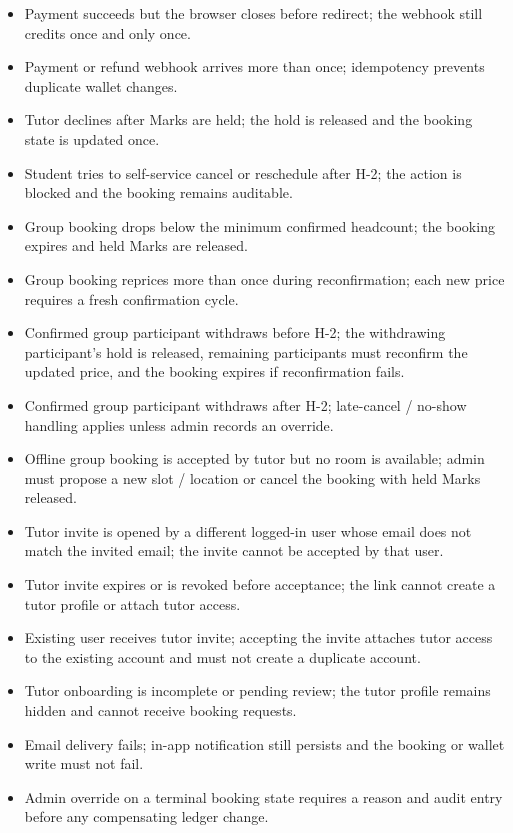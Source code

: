 \documentclass[11pt,a4paper]{article}
\begin{document}
\begin{itemize}
    \item Payment succeeds but the browser closes before redirect; the webhook still credits once and only once.
    \item Payment or refund webhook arrives more than once; idempotency prevents duplicate wallet changes.
    \item Tutor declines after Marks are held; the hold is released and the booking state is updated once.
    \item Student tries to self-service cancel or reschedule after H-2; the action is blocked and the booking remains auditable.
    \item Group booking drops below the minimum confirmed headcount; the booking expires and held Marks are released.
    \item Group booking reprices more than once during reconfirmation; each new price requires a fresh confirmation cycle.
    \item Confirmed group participant withdraws before H-2; the withdrawing participant's hold is released, remaining participants must reconfirm the updated price, and the booking expires if reconfirmation fails.
    \item Confirmed group participant withdraws after H-2; late-cancel / no-show handling applies unless admin records an override.
    \item Offline group booking is accepted by tutor but no room is available; admin must propose a new slot / location or cancel the booking with held Marks released.
    \item Tutor invite is opened by a different logged-in user whose email does not match the invited email; the invite cannot be accepted by that user.
    \item Tutor invite expires or is revoked before acceptance; the link cannot create a tutor profile or attach tutor access.
    \item Existing user receives tutor invite; accepting the invite attaches tutor access to the existing account and must not create a duplicate account.
    \item Tutor onboarding is incomplete or pending review; the tutor profile remains hidden and cannot receive booking requests.
    \item Email delivery fails; in-app notification still persists and the booking or wallet write must not fail.
    \item Admin override on a terminal booking state requires a reason and audit entry before any compensating ledger change.
\end{itemize}
\end{document}
